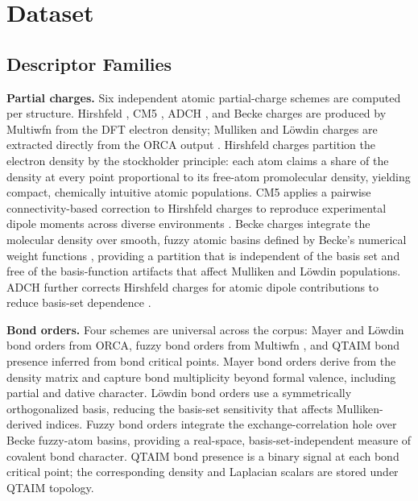 \section{Dataset}
\label{sec:dataset}


\subsection{Descriptor Families}

\textbf{Partial charges.}
Six independent atomic partial-charge schemes are computed per structure.
Hirshfeld \citep{hirshfeld1977}, CM5 \citep{cm5}, ADCH \citep{adch}, and Becke
\citep{becke1988} charges are produced by Multiwfn \citep{multiwfn} from the DFT electron density;
Mulliken and L\"owdin charges are extracted directly from the ORCA output \citep{orca5}.
Hirshfeld charges partition the electron density by the stockholder principle: each
atom claims a share of the density at every point proportional to its free-atom
promolecular density, yielding compact, chemically intuitive atomic populations.
CM5 applies a pairwise connectivity-based correction to Hirshfeld charges to
reproduce experimental dipole moments across diverse environments \citep{cm5}.
Becke charges integrate the molecular density over smooth, fuzzy atomic basins
defined by Becke's numerical weight functions \citep{becke1988}, providing a
partition that is independent of the basis set and free of the basis-function
artifacts that affect Mulliken and L\"owdin populations.
ADCH further corrects Hirshfeld charges for atomic dipole contributions to reduce
basis-set dependence \citep{adch}. 

\textbf{Bond orders.}
Four schemes are universal across the corpus: Mayer \citep{mayer1983} and
L\"owdin bond orders from ORCA, fuzzy bond orders from Multiwfn
\citep{multiwfn,becke1988}, and QTAIM bond presence inferred from bond critical points.
Mayer bond orders derive from the density matrix and capture bond multiplicity
beyond formal valence, including partial and dative character.
L\"owdin bond orders use a symmetrically orthogonalized basis, reducing
the basis-set sensitivity that affects Mulliken-derived indices.
Fuzzy bond orders integrate the exchange-correlation hole over Becke fuzzy-atom
basins, providing a real-space, basis-set-independent measure of covalent
bond character. QTAIM bond presence is a binary signal at each bond critical
point; the corresponding density and Laplacian scalars are stored under QTAIM topology.

